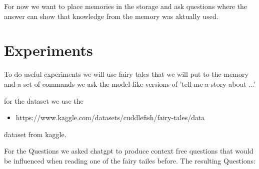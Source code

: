 \documentclass[11pt]{article}
\begin{document}
For now we want to place memories in the storage and ask questions where the answer can show that knowledge from the memory was aktually used.




\section{Experiments}

To do useful experiments we will use fairy tales that we will put to the memory and a set of commands we ask the model
like versions of 'tell me a story about ...' 

for the dataset we use the 

\begin{itemize}
\item https://www.kaggle.com/datasets/cuddlefish/fairy-tales/data
\end{itemize}

dataset from kaggle. 

For the Questions we asked chatgpt to produce context free questions that would be influenced when reading one of the fairy tailes before. The resulting Questions:
\end{document}
